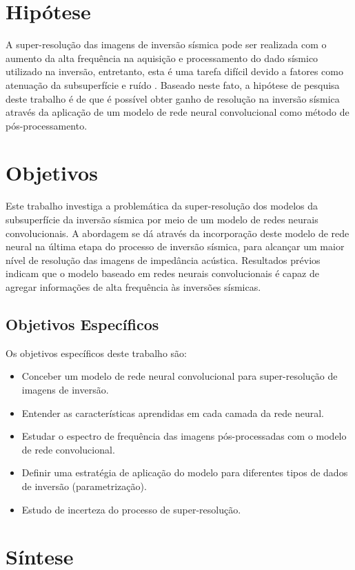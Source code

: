 \section{Hipótese}
A super-resolução das imagens de inversão sísmica pode ser realizada com o aumento da alta frequência na aquisição e
processamento do dado sísmico utilizado na inversão, entretanto, esta é uma tarefa difícil
devido a fatores como atenuação da subsuperfície e ruído \citep{Xiaoyu2012}.
Baseado neste fato, a hipótese de pesquisa deste trabalho é de que é possível obter ganho de resolução
na inversão sísmica através da aplicação de um modelo de rede neural convolucional como método de pós-processamento.

\section{Objetivos}

Este trabalho investiga a problemática da super-resolução dos modelos da subsuperfície da inversão sísmica
por meio de um modelo de redes neurais convolucionais.
A abordagem se dá através da incorporação deste modelo de rede neural na última
etapa do processo de inversão sísmica, para alcançar um maior nível de
resolução das imagens de impedância acústica.
Resultados prévios indicam que o modelo baseado em redes neurais convolucionais é capaz
de agregar informações de alta frequência às inversões sísmicas.

\subsection{Objetivos Específicos}
Os objetivos específicos deste trabalho são:
\begin{itemize}
 \item Conceber um modelo de rede neural convolucional para super-resolução de imagens de inversão.
 \item Entender as características aprendidas em cada camada da rede neural.
 \item Estudar o espectro de frequência das imagens pós-processadas com o modelo de rede convolucional.
 \item Definir uma estratégia de aplicação do modelo para diferentes tipos de dados de inversão (parametrização).
 \item Estudo de incerteza do processo de super-resolução.
\end{itemize}

\section{Síntese}

